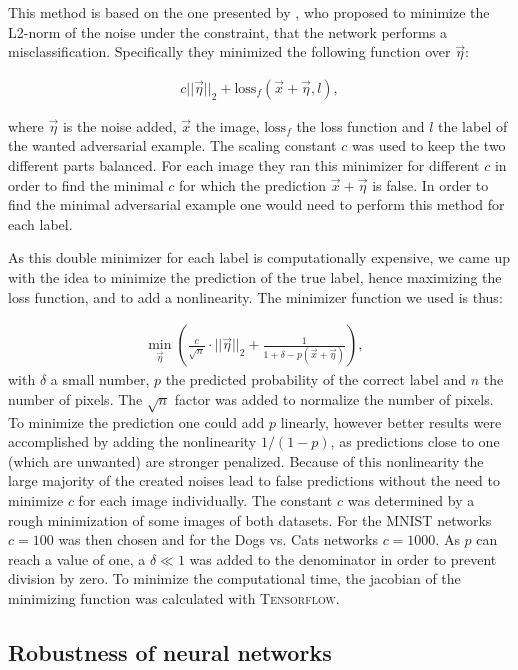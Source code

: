 \documentclass[%
 reprint,
 amsmath,amssymb,
 aps,
]{revtex4-1}
\begin{document}
This method is based on the one presented by \citeauthor{paperMinimize}, who proposed to minimize the L2-norm of the noise under the constraint, that the network performs a misclassification. Specifically they minimized the following function over $\vec{\eta}$:

\begin{align}
c||\vec{\eta}||_2 + \text{loss}_f (\vec{x}+\vec{\eta}, l),
\end{align}

where $\vec{\eta}$ is the noise added, $\vec{x}$ the image,  $\text{loss}_f$ the loss function and $l$ the label of the wanted adversarial example. The scaling constant $c$ was used to keep the two different parts balanced. For each image they ran this minimizer for different $c$ in order to find the minimal $c$ for which the prediction $\vec{x}+\vec{\eta}$ is false. In order to find the minimal adversarial example one would need to perform this method for each label. 

As this double minimizer for each label is computationally expensive, we came up with the idea to minimize the prediction of the true label, hence maximizing the loss function, and to add a nonlinearity. The minimizer function we used is thus:

\begin{align}
\min_{\vec{\eta}} \left( \frac{c}{\sqrt{n}} \cdot ||\vec{\eta}||_2 + \frac{1}{1 + \delta - p(\vec{x}+\vec{\eta})} \right), & \label{eq:minimize}
\end{align}
with $\delta$ a small number, $p$ the predicted probability of the correct label and $n$ the number of pixels. The $\sqrt{n}$ factor was added to normalize the number of pixels. To minimize the prediction one could add $p$ linearly, however better results were accomplished by adding the nonlinearity $1/(1-p)$, as predictions close to one (which are unwanted) are stronger penalized. Because of this nonlinearity the large majority of the created noises lead to false predictions without the need to minimize $c$ for each image individually.  The constant $c$ was determined by a rough minimization of some images of both datasets. 
For the MNIST networks $c = 100$  was then chosen and for the Dogs vs. Cats networks $c = 1000$. 
As $p$ can reach a value of one, a $\delta \ll 1$ was added to the denominator in order to prevent division by zero.
To minimize the computational time, the jacobian of the minimizing function was calculated with  \textsc{Tensorflow}.


\subsection{Robustness of neural networks}
\label{sec:hypothesis}
\end{document}
